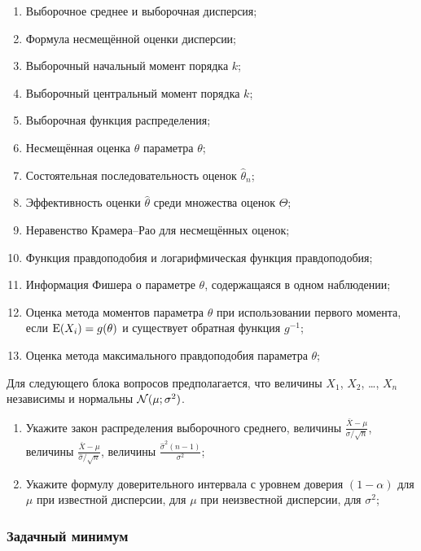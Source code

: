 \begin{enumerate}[resume]
  \item Выборочное среднее и выборочная дисперсия;
  \item Формула несмещённой оценки дисперсии;
  \item Выборочный начальный момент порядка $k$;
  \item Выборочный центральный момент порядка $k$;
  \item Выборочная функция распределения;
  \item Несмещённая оценка $\hat \theta$ параметра $\theta$;
  \item Состоятельная последовательность оценок $\hat \theta_n$;
  \item Эффективность оценки $\hat \theta$ среди множества оценок $\hat \Theta$;
  \item Неравенство Крамера–Рао для несмещённых оценок;
  \item Функция правдоподобия и логарифмическая функция правдоподобия;
  \item Информация Фишера о параметре $\theta$, содержащаяся в одном наблюдении;
  \item Оценка метода моментов параметра $\theta$ при использовании первого момента, если $\operatorname{E}(X_i)=g(\theta)$ и существует обратная функция $g^{-1}$;
  \item Оценка метода максимального правдоподобия параметра $\theta$;
\end{enumerate}

Для следующего блока вопросов предполагается, что величины $X_1$, $X_2$, \ldots, $X_n$ независимы и нормальны $\mathcal{N}(\mu;\sigma^2)$.

\begin{enumerate}[resume]
  \item Укажите закон распределения выборочного среднего, величины $\frac{\bar X - \mu}{\sigma/\sqrt{n}}$, величины $\frac{\bar X - \mu}{\hat\sigma/\sqrt{n}}$, величины $\frac{\hat\sigma^2(n-1)}{\sigma^2}$;
  \item Укажите формулу доверительного интервала с уровнем доверия $(1-\alpha)$ для $\mu$ при известной дисперсии, для $\mu$ при неизвестной дисперсии, для $\sigma^2$;
\end{enumerate}


\subsubsection*{Задачный минимум}

